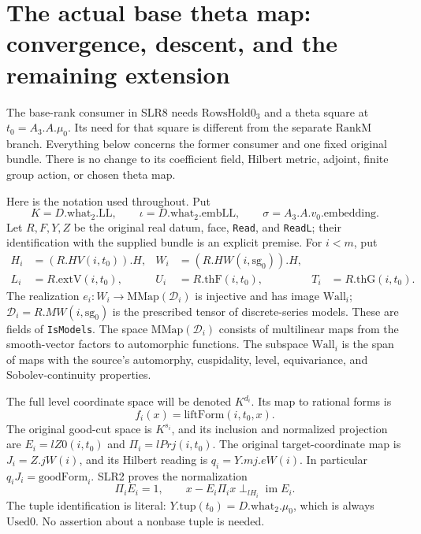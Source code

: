 \section{The actual base theta map: convergence, descent, and the remaining extension}
\label{sec:base-theta-v032}


The base-rank consumer in SLR8 needs \(\mathrm{RowsHold0}_3\) and a
theta square at \(t_0=A_3.A.\mu_0\).  Its need for that square is
different from the separate \(\mathrm{RankM}\) branch.  Everything
below concerns the former consumer and one fixed original bundle.
There is no change to its coefficient field, Hilbert metric, adjoint,
finite group action, or chosen theta map.

Here is the notation used throughout.  Put
\[
 K=D.\mathrm{what}_2.\mathrm{LL},\qquad
 \iota=D.\mathrm{what}_2.\mathrm{embLL},\qquad
 \sigma=A_3.A.v_0.\mathrm{embedding}.
 \tag{BTH.1}
\]
Let \(R,F,Y,Z\) be the original real datum, face, \texttt{Read},
and \texttt{Read\allowbreak L}; their identification with the supplied bundle is
an explicit premise.  For \(i<m\), put
\[
 \begin{aligned}
 H_i&=(R.HV(i,t_0)).H,&
 W_i&=(R.HW(i,\mathrm{sg}_0)).H,\\
 L_i&=R.\mathrm{extV}(i,t_0),&
 U_i&=R.\mathrm{thF}(i,t_0),&
 T_i&=R.\mathrm{thG}(i,t_0).
 \end{aligned}                                                  \tag{BTH.2}
\]
The realization \(e_i:W_i\to\mathrm{MMap}(\mathcal D_i)\) is injective
and has image \(\mathrm{Wall}_i\);
\(\mathcal D_i=R.MW(i,\mathrm{sg}_0)\) is the prescribed tensor of
discrete-series models.  These are
fields of \texttt{Is\allowbreak Models}.  The space \(\mathrm{MMap}(\mathcal D_i)\)
consists of multilinear maps from the smooth-vector factors to
automorphic functions.  The subspace \(\mathrm{Wall}_i\) is the
span of maps with the source's automorphy, cuspidality, level,
equivariance, and Sobolev-continuity properties.

The full level coordinate space will be denoted \(K^{d_i}\).
Its map to rational forms is
\[
 f_i(x)=\mathrm{liftForm}(i,t_0,x).
 \tag{BTH.3}
\]
The original good-cut space is \(K^{s_i}\), and its inclusion and
normalized projection are
\(E_i=lZ0(i,t_0)\) and \(\Pi_i=lPrj(i,t_0)\).
The original target-coordinate map is \(J_i=Z.jW(i)\), and its
Hilbert reading is \(q_i=Y.mj.eW(i)\).
In particular \(q_iJ_i=\mathrm{goodForm}_i\).  SLR2 proves the
normalization
\[
 \Pi_iE_i=1,\qquad
 x-E_i\Pi_i x\perp_{lH_i}\operatorname{im}E_i.                    \tag{BTH.4}
\]
The tuple identification is literal:
\(Y.\mathrm{tup}(t_0)=D.\mathrm{what}_2.\mu_0\), which is
always \(\mathrm{Used0}\).  No assertion about a nonbase tuple
is needed.

